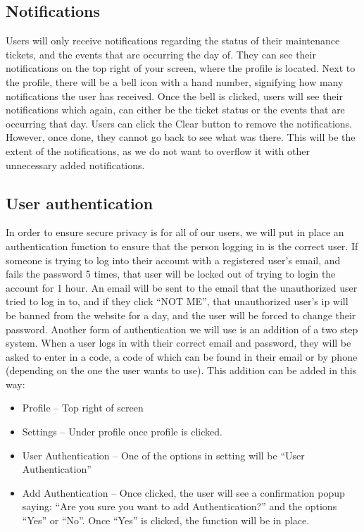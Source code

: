 \documentclass[conference]{IEEEtran}
\begin{document}
\subsection{Notifications}
Users will only receive notifications regarding the status of their maintenance tickets, and the events that are occurring the day of. They can see their notifications on the top right of your screen, where the profile is located. Next to the profile, there will be a bell icon with a hand number, signifying how many notifications the user has received. Once the bell is clicked, users will see their notifications which again, can either be the ticket status or the events that are occurring that day. Users can click the Clear button to remove the notifications. However, once done, they cannot go back to see what was there. This will be the extent of the notifications, as we do not want to overflow it with other unnecessary added notifications.
\subsection{User authentication}
In order to ensure secure privacy is for all of our users, we will put in place an authentication function to ensure that the person logging in is the correct user. If someone is trying to log into their account with a registered user's email, and fails the password 5 times, that user will be locked out of trying to login the account for 1 hour. An email will be sent to the email that the unauthorized user tried to log in to, and if they click “NOT ME”, that unauthorized user’s ip will be banned from the website for a day, and the user will be forced to change their password. Another form of authentication we will use is an addition of a two step system. When a user logs in with their correct email and password, they will be asked to enter in a code, a code of which can be found in their email or by phone (depending on the one the user wants to use). This addition can be added in this way:
\begin{itemize}
    \item Profile – Top right of screen
    \item Settings – Under profile once profile is clicked.
    \item User Authentication – One of the options in setting will be “User Authentication”
    \item Add Authentication – Once clicked, the user will see a confirmation popup saying: “Are you sure you want to add Authentication?” and the options “Yes” or “No”. Once “Yes” is clicked, the function will be in place.
\end{itemize}
\end{document}
